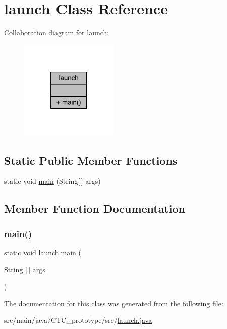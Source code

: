 \hypertarget{classlaunch}{}\section{launch Class Reference}
\label{classlaunch}


Collaboration diagram for launch\+:
\nopagebreak
\begin{figure}[H]
\begin{center}
\leavevmode
\includegraphics[width=133pt]{classlaunch__coll__graph}
\end{center}
\end{figure}
\subsection*{Static Public Member Functions}
\begin{DoxyCompactItemize}
\item 
static void \hyperlink{classlaunch_a19aea6ad098436eb0709e850e4c5b41d}{main} (String\mbox{[}$\,$\mbox{]} args)
\end{DoxyCompactItemize}


\subsection{Member Function Documentation}
\mbox{\label{classlaunch_a19aea6ad098436eb0709e850e4c5b41d}} 
\subsubsection{\texorpdfstring{main()}{main()}}
{\footnotesize\ttfamily static void launch.\+main (\begin{DoxyParamCaption}\item[{String \mbox{[}$\,$\mbox{]}}]{args }\end{DoxyParamCaption})\hspace{0.3cm}{\ttfamily [static]}}



The documentation for this class was generated from the following file\+:\begin{DoxyCompactItemize}
\item 
src/main/java/\+C\+T\+C\+\_\+prototype/src/\hyperlink{launch_8java}{launch.\+java}\end{DoxyCompactItemize}
